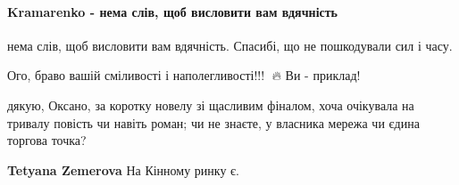  
 
 
 
 
\paragraph{Kramarenko - нема слів, щоб висловити вам вдячність}
\label{sec:25_07_2021.fb.hvylja_oksana.1.otchet_druzja.cmt.kramarenko_vdjachnist}

\begin{itemize}
 
нема слів, щоб висловити вам вдячність. Спасибі, що не пошкодували сил і часу.

 
Ого, браво вашій сміливості і наполегливості!!!👏 🔥 Ви - приклад!

 

дякую, Оксано, за коротку новелу зі щасливим фіналом, хоча очікувала на тривалу
повість чи навіть роман; чи не знаєте, у власника мережа чи єдина торгова
точка?

\begin{itemize}
 
\textbf{Tetyana Zemerova} На Кінному ринку є.


\end{itemize}
\end{itemize}
